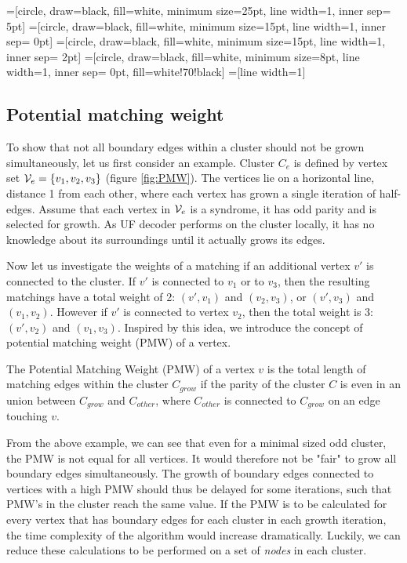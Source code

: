 =[circle, draw=black, fill=white, minimum size=25pt, line width=1, inner sep= 5pt]
=[circle, draw=black, fill=white, minimum size=15pt, line width=1, inner sep= 0pt]
=[circle, draw=black, fill=white, minimum size=15pt, line width=1, inner sep= 2pt]
=[circle, draw=black, fill=white, minimum size=8pt, line width=1, inner sep= 0pt, fill=white!70!black]
=[line width=1]
\tikzfading[name=fade right, left color=transparent!0, right color=transparent!100]


\subsection{Potential matching weight}\label{sec:PMW}

To show that not all boundary edges within a cluster should not be grown simultaneously, let us first consider an example. Cluster $C_e$ is defined by vertex set $\mathcal{V}_e = \{v_1, v_2, v_3\}$ (figure \ref{fig:PMW}). The vertices lie on a horizontal line, distance 1 from each other, where each vertex has grown a single iteration of half-edges. Assume that each vertex in $\mathcal{V}_e$ is a syndrome, it has odd parity and is selected for growth. As UF decoder performs on the cluster locally, it has no knowledge about its surroundings until it actually grows its edges.

Now let us investigate the weights of a matching if an additional vertex $v'$ is connected to the cluster.
If $v'$ is connected to $v_1$ or to $v_3$, then the resulting matchings have a total weight of 2: $(v',v_1)$ and $(v_2,v_3)$, or $(v',v_3)$ and $(v_1,v_2)$. However if $v'$ is connected to vertex $v_2$, then the total weight is 3: $(v', v_2)$ and $(v_1, v_3)$. Inspired by this idea, we introduce the concept of potential matching weight (PMW) of a vertex.

\begin{lemma}
  The Potential Matching Weight (PMW) of a vertex $v$ is the total length of matching edges within the cluster $C_{grow}$ if the parity of the cluster $C$ is even in an union between $C_{grow}$ and $C_{other}$, where $C_{other}$ is connected to $C_{grow}$ on an edge touching $v$.
\end{lemma}

From the above example, we can see that even for a minimal sized odd cluster, the PMW is not equal for all vertices. It would therefore not be "fair" to grow all boundary edges simultaneously. The growth of boundary edges connected to vertices with a high PMW should thus be delayed for some iterations, such that PMW's in the cluster reach the same value. If the PMW is to be calculated for every vertex that has boundary edges for each cluster in each growth iteration, the time complexity of the algorithm would increase dramatically. Luckily, we can reduce these calculations to be performed on a set of \emph{nodes} in each cluster.

